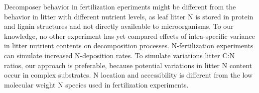 \documentclass[authoryear,preprint,review,12pt]{elsarticle}
\begin{document}
                                                                                                                                                                                                                                                                                                                                                                                                                                                                                                                                                                                                                                                                                                                                                                                                                                                                                                                                                                                                                                                                                                                              Decomposer behavior in fertilization eperiments might be different from the behavior in litter with different nutrient levels, as leaf litter N is stored in protein and lignin structures and not directly availeable to microorganisms. To our knowledge, no other experiment has yet compared effects of intra-specific variance in litter nutrient contents on decomposition processes. N-fertilization experiments can simulate increased N-deposition rates. To simulate variations litter C:N ratios, our approach is preferable, because potential variations in litter N content occur in complex substrates. N location and accessibility is different from the low molecular weight N species used in fertilization experiments.
\end{document}
